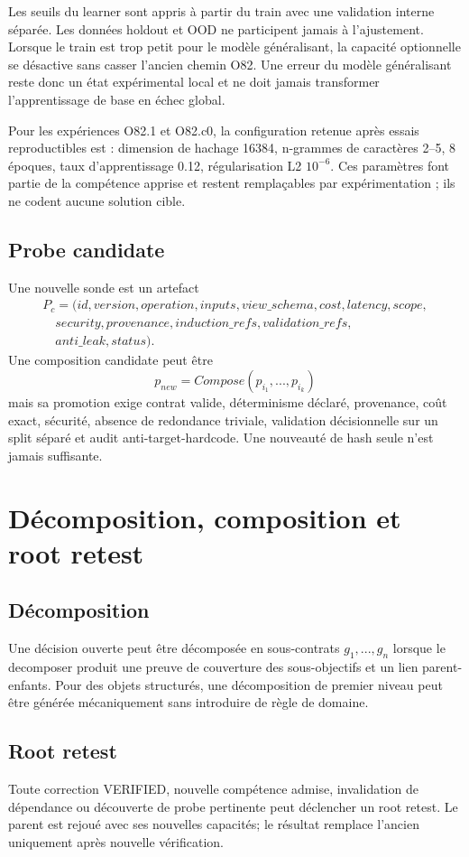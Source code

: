 \documentclass[11pt,a4paper]{report}
\begin{document}
Les seuils du learner sont appris à partir du train avec une validation interne séparée. Les données holdout et OOD ne participent jamais à l'ajustement. Lorsque le train est trop petit pour le modèle généralisant, la capacité optionnelle se désactive sans casser l'ancien chemin O82. Une erreur du modèle généralisant reste donc un état expérimental local et ne doit jamais transformer l'apprentissage de base en échec global.

Pour les expériences O82.1 et O82.c0, la configuration retenue après essais reproductibles est : dimension de hachage 16384, n-grammes de caractères 2--5, 8 époques, taux d'apprentissage 0.12, régularisation L2 $10^{-6}$. Ces paramètres font partie de la compétence apprise et restent remplaçables par expérimentation ; ils ne codent aucune solution cible.

\section{Probe candidate}
Une nouvelle sonde est un artefact
\[
\begin{aligned}
P_c=(id,version,operation,inputs,view\_schema,cost,latency,scope,\\
\quad security,provenance,induction\_refs,validation\_refs,\\
\quad anti\_leak,status).
\end{aligned}
\]
Une composition candidate peut être
\[
p_{new}=Compose(p_{i_1},...,p_{i_k})
\]
mais sa promotion exige contrat valide, déterminisme déclaré, provenance, coût exact, sécurité, absence de redondance triviale, validation décisionnelle sur un split séparé et audit anti-target-hardcode. Une nouveauté de hash seule n'est jamais suffisante.

\chapter{Décomposition, composition et root retest}
\section{Décomposition}
Une décision ouverte peut être décomposée en sous-contrats $g_1,...,g_n$ lorsque le decomposer produit une preuve de couverture des sous-objectifs et un lien parent-enfants. Pour des objets structurés, une décomposition de premier niveau peut être générée mécaniquement sans introduire de règle de domaine.

\section{Root retest}
Toute correction VERIFIED, nouvelle compétence admise, invalidation de dépendance ou découverte de probe pertinente peut déclencher un root retest. Le parent est rejoué avec ses nouvelles capacités; le résultat remplace l'ancien uniquement après nouvelle vérification.
\end{document}
